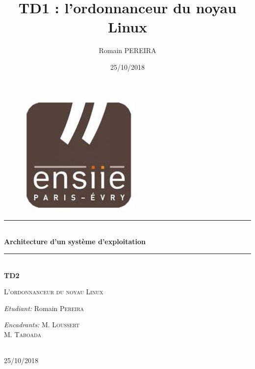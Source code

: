 \documentclass[10pt]{article}
\title{TD1 : l'ordonnanceur du noyau Linux}
\author{Romain PEREIRA}
\date{25/10/2018}
\newcommand{\HRule}{\rule{\linewidth}{0.5mm}}
\begin{document}
    
    \begin{titlepage}
        \begin{sffamily}
            \begin{center}
                
                                
                \begin{figure}[h!]
                    \includegraphics[width=6cm]{ensiie.jpeg}
                \end{figure}

                \HRule \\[0.4cm]
                { \huge \bfseries Architecture d'un système d'exploitation\\[0.4cm] }
                \HRule \\[2.0cm]
                
                { \huge \bfseries TD2\\[0.5cm] }

                \textsc{\Large L'ordonnanceur du noyau Linux}\\[2.0cm]

                \vfill
                \begin{minipage}{0.4\textwidth}
                    \begin{flushleft} \large
                        \emph{Etudiant:} Romain \textsc{Pereira}\\
                    \end{flushleft}
                \end{minipage}
                \begin{minipage}{0.4\textwidth}
                    \begin{flushright} \large
                        \emph{Encadrants:}  M. \textsc{Loussert}\\
                                            M. \textsc{Taboada}
                    \end{flushright}
                \end{minipage}
                \\[2.0cm]
                {\large 25/10/2018}
            \end{center}
        \end{sffamily}
    \end{titlepage}
    
\end{document}
